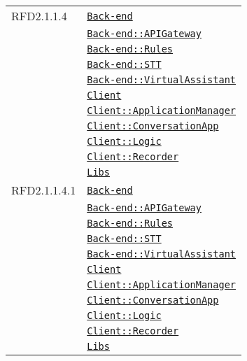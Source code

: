 \begin{longtable}{|>{\centering}m{3cm}|m{10cm}<{\centering}|}
RFD2.1.1.4 & \hyperref[Back-end]{\texttt{Back-end}}\\
& \hyperref[Back-end::APIGateway]{\texttt{Back-end::APIGateway}}\\
& \hyperref[Back-end::Rules]{\texttt{Back-end::Rules}}\\
& \hyperref[Back-end::STT]{\texttt{Back-end::STT}}\\
& \hyperref[Back-end::VirtualAssistant]{\texttt{Back-end::VirtualAssistant}}\\
& \hyperref[Client]{\texttt{Client}}\\
& \hyperref[Client::ApplicationManager]{\texttt{Client::ApplicationManager}}\\
& \hyperref[Client::ConversationApp]{\texttt{Client::ConversationApp}}\\
& \hyperref[Client::Logic]{\texttt{Client::Logic}}\\
& \hyperref[Client::Recorder]{\texttt{Client::Recorder}}\\
& \hyperref[Libs]{\texttt{Libs}}\\ \hline

RFD2.1.1.4.1 & \hyperref[Back-end]{\texttt{Back-end}}\\
& \hyperref[Back-end::APIGateway]{\texttt{Back-end::APIGateway}}\\
& \hyperref[Back-end::Rules]{\texttt{Back-end::Rules}}\\
& \hyperref[Back-end::STT]{\texttt{Back-end::STT}}\\
& \hyperref[Back-end::VirtualAssistant]{\texttt{Back-end::VirtualAssistant}}\\
& \hyperref[Client]{\texttt{Client}}\\
& \hyperref[Client::ApplicationManager]{\texttt{Client::ApplicationManager}}\\
& \hyperref[Client::ConversationApp]{\texttt{Client::ConversationApp}}\\
& \hyperref[Client::Logic]{\texttt{Client::Logic}}\\
& \hyperref[Client::Recorder]{\texttt{Client::Recorder}}\\
& \hyperref[Libs]{\texttt{Libs}}\\ \hline


\end{longtable}
